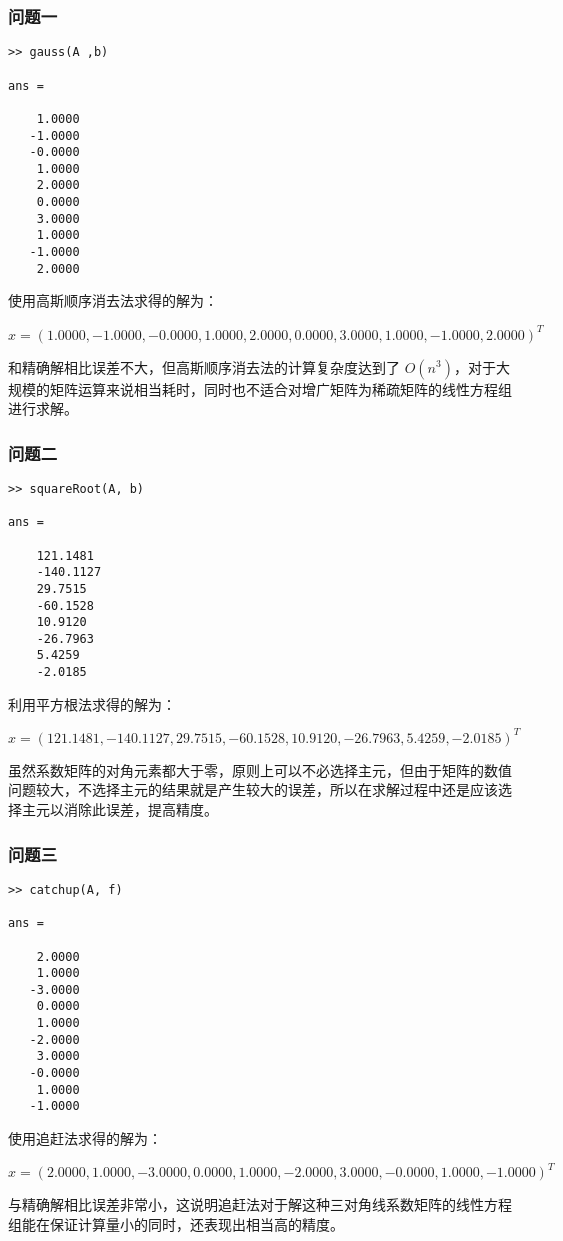 \subsubsection{问题一}

\begin{lstlisting}[frame=single]
>> gauss(A ,b)

ans =

    1.0000
   -1.0000
   -0.0000
    1.0000
    2.0000
    0.0000
    3.0000
    1.0000
   -1.0000
    2.0000

\end{lstlisting}

使用高斯顺序消去法求得的解为：

\[x = (1.0000, -1.0000, -0.0000, 1.0000, 2.0000, 0.0000, 3.0000, 1.0000, -1.0000, 2.0000)^T\]

和精确解相比误差不大，但高斯顺序消去法的计算复杂度达到了 $O(n^3)$，对于大规模的矩阵运算来说相当耗时，同时也不适合对增广矩阵为稀疏矩阵的线性方程组进行求解。

\subsubsection{问题二}

\begin{lstlisting}[frame=single]
>> squareRoot(A, b)

ans =

    121.1481
    -140.1127
    29.7515
    -60.1528
    10.9120
    -26.7963
    5.4259
    -2.0185

\end{lstlisting}

利用平方根法求得的解为：

\[x = (121.1481, -140.1127, 29.7515, -60.1528, 10.9120, -26.7963, 5.4259, -2.0185)^T\]

虽然系数矩阵的对角元素都大于零，原则上可以不必选择主元，但由于矩阵的数值问题较大，不选择主元的结果就是产生较大的误差，所以在求解过程中还是应该选择主元以消除此误差，提高精度。

\subsubsection{问题三}

\begin{lstlisting}[frame=single]
>> catchup(A, f)

ans =

    2.0000
    1.0000
   -3.0000
    0.0000
    1.0000
   -2.0000
    3.0000
   -0.0000
    1.0000
   -1.0000

\end{lstlisting}

使用追赶法求得的解为：

\[x= (2.0000,1.0000,-3.0000,0.0000,1.0000,-2.0000,3.0000,-0.0000,1.0000,-1.0000) ^ T\]

与精确解相比误差非常小，这说明追赶法对于解这种三对角线系数矩阵的线性方程组能在保证计算量小的同时，还表现出相当高的精度。